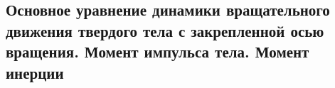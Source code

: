 \subsection{Основное уравнение динамики вращательного движения твердого тела с закрепленной осью вращения. Момент импульса тела. Момент инерции}